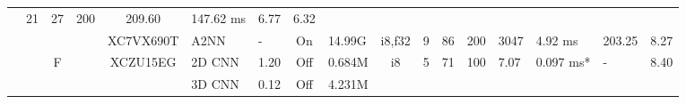 \begin{table}
\begin{adjustbox}{totalheight=\baselineskip,}
\begin{tabular}{ccccclp{2em}cp{3em}cp{2em}p{4em}p{3em}p{3.5em}p{3.5em}p{2.5em}p{3em}}
                                       &\multirow{1}{*}{21}
                                           &\multirow{1}{*}{27}
                                               &\multirow{1}{*}{200}
                                                   &\multirow{1}{*}{209.60}
                                                       &\multirow{1}{*}{147.62 ms}
                                                           &\multirow{1}{*}{6.77}
                                                               &\multirow{1}{*}{6.32}\\
\cmidrule{4-17}
   &   &   &\multirow{1}{*}{\cite{zhangExtremelyPipelinedFPGAbased2023a}}
               &\multirow{1}{*}{XC7VX690T}
                   &\multirow{1}{*}{A2NN}
                       &\multirow{1}{*}{-}
                           &\multirow{1}{*}{On}
                               &\multirow{1}{*}{14.99G}
                                   &\multirow{1}{*}{i8,f32}
                                       &\multirow{1}{*}{9}
                                           &\multirow{1}{*}{86}
                                               &\multirow{1}{*}{200}
                                                   &\multirow{1}{*}{3047}
                                                       &\multirow{1}{*}{4.92 ms}
                                                           &\multirow{1}{*}{203.25}
                                                               &\multirow{1}{*}{8.27}\\
\cmidrule{3-17}
   &   &\multirow{13}{*}{F}
           &\multirow{3}{*}{\cite{heConfigurable2D3D2023a}}
               &\multirow{3}{*}{XCZU15EG}
                   &\multirow{1}{*}{2D CNN}
                       &\multirow{1}{*}{1.20}
                           &\multirow{1}{*}{Off}
                               &\multirow{1}{*}{0.684M}
                                   &\multirow{1}{*}{i8}
                                       &\multirow{1}{*}{5}
                                           &\multirow{1}{*}{71}
                                               &\multirow{1}{*}{100}
                                                   &\multirow{1}{*}{7.07}
                                                       &\multirow{1}{*}{0.097 ms*}
                                                           &\multirow{1}{*}{-}
                                                               &\multirow{1}{*}{8.40}\\
   &   &   &   &   &\multirow{1}{*}{3D CNN}
                       &\multirow{1}{*}{0.12}
                           &\multirow{1}{*}{Off}
                               &\multirow{1}{*}{4.231M}

\end{tabular}
\end{adjustbox}
\end{table}
